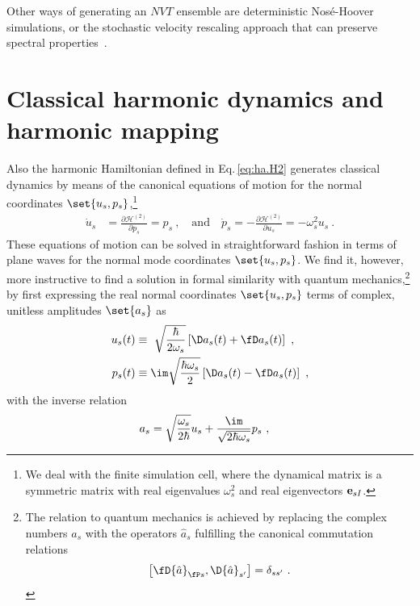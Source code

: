Other ways of generating an $NVT$ ensemble are deterministic Nos\'e-Hoover simulations, or the stochastic velocity rescaling approach that can preserve spectral properties~\cite{Nose1984,Hoover1985,Bussi2007}.

%

\newpage

\section{Classical harmonic dynamics and harmonic mapping}
Also the harmonic Hamiltonian defined in Eq.\,\eqref{eq:ha.H2} generates classical dynamics by means of the canonical equations of motion for the normal coordinates $\set{ u_s, p_s}$,\footnote{We deal with the finite simulation cell, where the dynamical matrix is a symmetric matrix with real eigenvalues $\omega^2_s$ and real eigenvectors ${\bf e}_{sI}$.}
\begin{align}
\dot{u}_s
& = \frac{\partial \mathcal H^{(2)}}{\partial p_s}
= p_s~,\quad\text{and}\quad
\dot{p}_s
= - \frac{\partial \mathcal H^{(2)}}{\partial u_s}
= - \omega^2_s u_s~.
\label{eq:ha.canonical.eom}
\end{align}
These equations of motion can be solved in straightforward fashion in terms of plane waves for the normal mode coordinates $\set{u_s, p_s}$. We find it, however, more instructive to find a solution in formal similarity with quantum mechanics,\footnote{The relation to quantum mechanics is achieved by replacing the complex numbers $a_s$ with the operators $\hat{a}_s$ fulfilling the canonical commutation relations $$\left[ \fD{\hat{a}}_{\fP s}, \D{\hat a}_{s'} \right] = \delta_{ss'}~.$$} by first expressing the real normal coordinates $\set{u_s, p_s}$ terms of complex, unitless amplitudes $\set{a_s}$ as
\begin{subequations}
	\label{eq:u_s.amplitudes}
	\begin{align}
	u_s (t) 
	&\equiv ~ \sqrt{\frac{\hbar}{2 \omega_s}} \left[ \D a_s (t) + \fD a_s (t) \right]~, \\
	p_s (t) 
	&\equiv \im \sqrt{\frac{\hbar \omega_s}{2}} \left[ \D a_s (t) - \fD a_s (t) \right]~,
	\end{align}
\end{subequations}
with the inverse relation
\begin{align}
	a_s
	&= \sqrt{\frac{\omega_s}{2 \hbar}} u_s + \frac{\im}{\sqrt{2 \hbar \omega_s}} p_s 	\label{eq:a_st}~,
\end{align}
